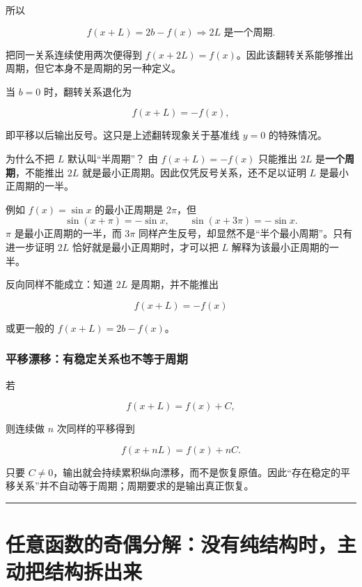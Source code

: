 \documentclass[11pt,a4paper]{ctexart}
\begin{document}
所以

\[
\boxed{f(x+L)=2b-f(x)\Longrightarrow 2L\text{ 是一个周期}.}
\]

把同一关系连续使用两次便得到 $f(x+2L)=f(x)$。因此该翻转关系能够推出周期，但它本身不是周期的另一种定义。

当 \(b=0\) 时，翻转关系退化为

\[
f(x+L)=-f(x),
\]

即平移以后输出反号。这只是上述翻转现象关于基准线 \(y=0\) 的特殊情况。

\begin{warnbox}{为什么不把 \(L\) 默认叫``半周期''？}
由 \(f(x+L)=-f(x)\) 只能推出 \(2L\) 是\textbf{一个周期}，不能推出 \(2L\) 就是最小正周期。因此仅凭反号关系，还不足以证明 \(L\) 是最小正周期的一半。

例如 \(f(x)=\sin x\) 的最小正周期是 \(2\pi\)，但
\[
\sin(x+\pi)=-\sin x,
\qquad
\sin(x+3\pi)=-\sin x.
\]
\(\pi\) 是最小正周期的一半，而 \(3\pi\) 同样产生反号，却显然不是``半个最小周期''。只有进一步证明 \(2L\) 恰好就是最小正周期时，才可以把 \(L\) 解释为该最小正周期的一半。
\end{warnbox}

反向同样不能成立：知道 \(2L\) 是周期，并不能推出

\[
f(x+L)=-f(x)
\]

或更一般的 \(f(x+L)=2b-f(x)\)。

\subsubsection{平移漂移：有稳定关系也不等于周期}\label{ux5e73ux79fbux6f02ux79fb}

若

\[
f(x+L)=f(x)+C,
\]

则连续做 \(n\) 次同样的平移得到

\[
f(x+nL)=f(x)+nC.
\]

只要 \(C\ne0\)，输出就会持续累积纵向漂移，而不是恢复原值。因此``存在稳定的平移关系''并不自动等于周期；周期要求的是输出真正恢复。

\begin{center}\rule{0.5\linewidth}{0.5pt}\end{center}

\section{任意函数的奇偶分解：没有纯结构时，主动把结构拆出来}\label{ux4efbux610fux51fdux6570ux7684ux5947ux5076ux5206ux89e3ux6ca1ux6709ux7eafux7ed3ux6784ux65f6ux4e3bux52a8ux628aux7ed3ux6784ux62c6ux51faux6765}
\end{document}
